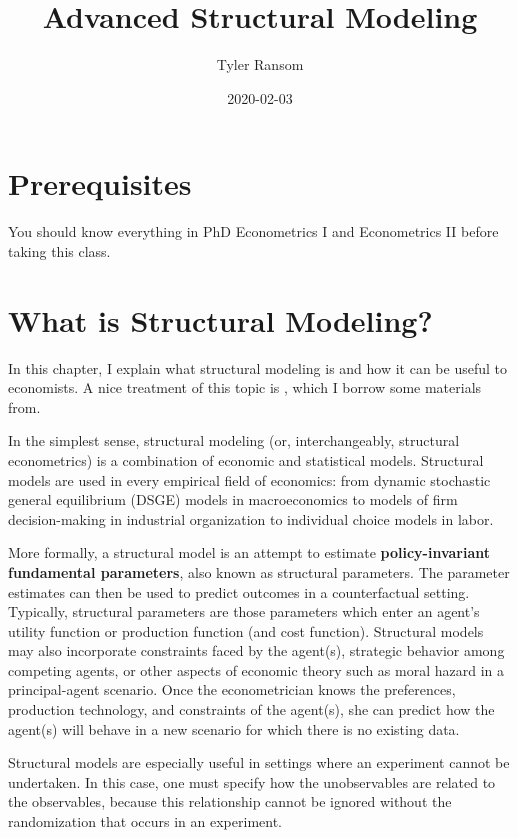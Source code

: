 \documentclass[]{book}
\title{Advanced Structural Modeling}
\author{Tyler Ransom}
\date{2020-02-03}
\begin{document}
\maketitle


{
\hypersetup{linkcolor=black}
\setcounter{tocdepth}{2}
\tableofcontents
}
\section{Prerequisites}\label{prerequisites}

You should know everything in PhD Econometrics I and Econometrics II
before taking this class.

\section{What is Structural Modeling?}\label{intro}

In this chapter, I explain what structural modeling is and how it can be
useful to economists. A nice treatment of this topic is
\citet{reissWolak2007}, which I borrow some materials from.

In the simplest sense, structural modeling (or, interchangeably,
structural econometrics) is a combination of economic and statistical
models. Structural models are used in every empirical field of
economics: from dynamic stochastic general equilibrium (DSGE) models in
macroeconomics to models of firm decision-making in industrial
organization to individual choice models in labor.

More formally, a structural model is an attempt to estimate
\textbf{policy-invariant fundamental parameters}, also known as
structural parameters. The parameter estimates can then be used to
predict outcomes in a counterfactual setting. Typically, structural
parameters are those parameters which enter an agent's utility function
or production function (and cost function). Structural models may also
incorporate constraints faced by the agent(s), strategic behavior among
competing agents, or other aspects of economic theory such as moral
hazard in a principal-agent scenario. Once the econometrician knows the
preferences, production technology, and constraints of the agent(s), she
can predict how the agent(s) will behave in a new scenario for which
there is no existing data.

Structural models are especially useful in settings where an experiment
cannot be undertaken. In this case, one must specify how the
unobservables are related to the observables, because this relationship
cannot be ignored without the randomization that occurs in an
experiment.
\end{document}
